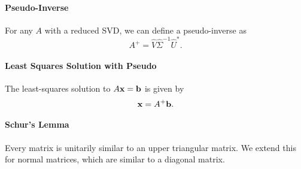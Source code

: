 \paragraph{Pseudo-Inverse}
For any \( A \) with a reduced SVD, we can define a pseudo-inverse
as \[
    A^+ = \hat{V} \hat{\Sigma}^{-1} \hat{U}^*
.\]

\paragraph{Least Squares Solution with Pseudo}
The least-squares solution to \( A \mathbf{x} = \mathbf{b} \)
is given by \[
    \mathbf{x} = A^+ \mathbf{b}
.\]

\paragraph{Schur's Lemma}
Every matrix is unitarily similar to an upper triangular matrix.
We extend this for normal matrices, which are similar to
a diagonal matrix.
